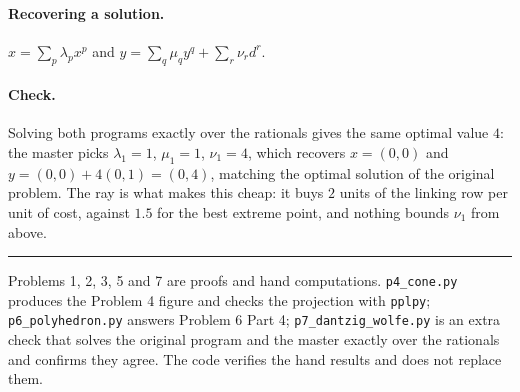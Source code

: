 \documentclass[11pt]{article}
\theoremstyle{definition}
\theoremstyle{plain}
\begin{document}
\paragraph{Recovering a solution.}
$x = \sum_p \lambda_p x^p$ and
$y = \sum_q \mu_q y^q + \sum_r \nu_r d^r$.

\paragraph{Check.} Solving both programs exactly over the rationals
gives the same optimal value $4$: the master picks
$\lambda_1 = 1$, $\mu_1 = 1$, $\nu_1 = 4$, which recovers
$x = (0,0)$ and $y = (0,0) + 4(0,1) = (0,4)$, matching the optimal
solution of the original problem. The ray is what makes this cheap: it
buys $2$ units of the linking row per unit of cost, against $1.5$ for
the best extreme point, and nothing bounds $\nu_1$ from above.

\vspace{1em}
\hrule
\vspace{0.6em}
{\small Problems 1, 2, 3, 5 and 7 are proofs and hand computations.
\texttt{p4\_cone.py} produces the Problem 4 figure and checks the
projection with \texttt{pplpy}; \texttt{p6\_polyhedron.py} answers
Problem 6 Part 4; \texttt{p7\_dantzig\_wolfe.py} is an extra check that
solves the original program and the master exactly over the rationals
and confirms they agree. The code verifies the hand results and does not
replace them.}
\end{document}
